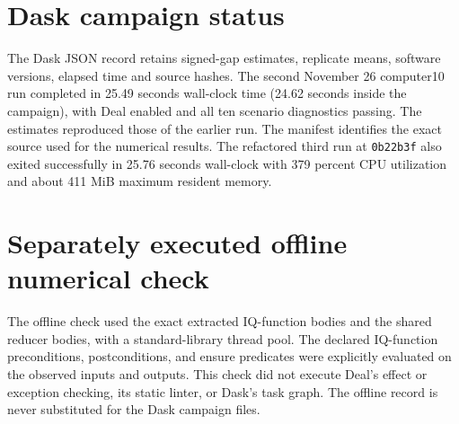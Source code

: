 \section{Dask campaign status}
The Dask JSON record retains signed-gap estimates, replicate means, software
versions, elapsed time and source hashes. The second November 26 computer10
run completed in 25.49 seconds wall-clock time (24.62 seconds inside the
campaign), with Deal enabled and all ten scenario diagnostics passing.
The estimates reproduced those of the earlier run. The manifest identifies
the exact source used for the numerical results. The refactored third
run at \texttt{0b22b3f} also exited successfully in 25.76 seconds wall-clock
with 379 percent CPU utilization and about 411 MiB maximum resident memory.
\section{Separately executed offline numerical check}

The offline check used the exact extracted IQ-function bodies and the
shared reducer bodies, with a standard-library thread pool. The declared
IQ-function preconditions, postconditions, and ensure predicates were
explicitly evaluated on the observed inputs and outputs. This check did
not execute Deal's effect or exception checking, its static linter, or
Dask's task graph. The offline record is never substituted for the Dask
campaign files.
